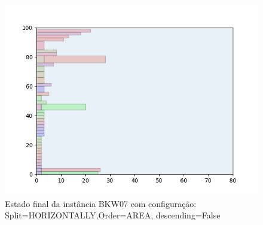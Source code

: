 \begin{figure}[H]
    \centering
    \caption[]{Estado final da instância BKW07 com configuração: Split=HORIZONTALLY,Order=AREA, descending=False}
    \label{fig:bkw07-horizontally-area-false}
    \includegraphics[scale=0.5]{output/figures/bkw/bkw07/horizontally/area/false/00}
\end{figure}